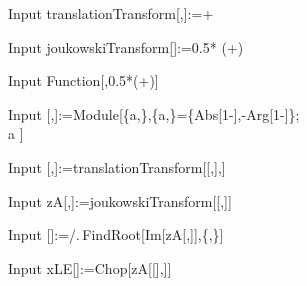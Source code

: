 \begin{mmaCell}[moredefined={translationTransform}]{Input}
	 translationTransform[\mmaPat{\(\pmb{\zeta}\)_},\mmaPat{\(\pmb{\mu}\)_}]:=\mmaPat{\(\pmb{\zeta}\)}+\mmaPat{\(\pmb{\mu}\)}
\end{mmaCell}
\begin{mmaCell}[moredefined={joukowskiTransform}]{Input}
	 joukowskiTransform[\mmaPat{\(\pmb{\zeta}\)_}]:=0.5* (\mmaPat{\(\pmb{\zeta}\)}+)
\end{mmaCell}
\begin{mmaCell}{Input}
	 Function[\mmaPat{\(\pmb{\zeta}\)},0.5*(\mmaPat{\(\pmb{\zeta}\)}+)]
\end{mmaCell}
\begin{mmaCell}[morelocal={a}]{Input}
	 [\mmaPat{\(\pmb{\theta}\)_},\mmaPat{\(\pmb{\mu}\)_}]:=Module[\{a,\mmaLoc{\(\pmb{\beta}\)}\},\{a,\mmaLoc{\(\pmb{\beta}\)}\}=\{Abs[1-\mmaPat{\(\pmb{\mu}\)}],-Arg[1-\mmaPat{\(\pmb{\mu}\)}]\};\\a {}]
\end{mmaCell}
\begin{mmaCell}[moredefined={translationTransform}]{Input}
	 [\mmaPat{\(\pmb{\theta}\)_},\mmaPat{\(\pmb{\mu}\)_}]:=translationTransform[[\mmaPat{\(\pmb{\theta}\)},\mmaPat{\(\pmb{\mu}\)}],\mmaPat{\(\pmb{\mu}\)}]
\end{mmaCell}
\begin{mmaCell}[moredefined={zA, joukowskiTransform}]{Input}
	 zA[\mmaPat{\(\pmb{\theta}\)_},\mmaPat{\(\pmb{\mu}\)_}]:=joukowskiTransform[[\mmaPat{\(\pmb{\theta}\)},\mmaPat{\(\pmb{\mu}\)}]]
\end{mmaCell}
\begin{mmaCell}[moredefined={zA}]{Input}
	[\mmaPat{\(\pmb{\mu}\)_}]:=\mmaUnd{\(\pmb{\theta}\)}/.\(\pmb{\,}\)FindRoot[Im[zA[\mmaFnc{\(\pmb{\theta}\)},\mmaPat{\(\pmb{\mu}\)}]],\{\mmaFnc{\(\pmb{\theta}\)},\mmaDef{\(\pmb{\pi}\)}\}]
\end{mmaCell}

\begin{mmaCell}[moredefined={xLE, zA}]{Input}
	xLE[\mmaPat{\(\pmb{\mu}\)_}]:=Chop[zA[[\mmaPat{\(\pmb{\mu}\)}],\mmaPat{\(\pmb{\mu}\)}]]
\end{mmaCell}



